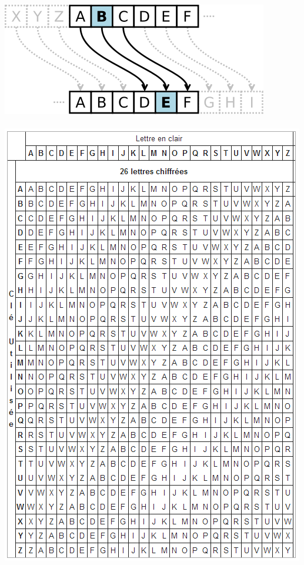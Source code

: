 \documentclass[a4paper,12pt,abstracton,titlepage]{scrartcl}
\begin{document}
  \begin{minipage}[t]{0.4\linewidth}
    \raggedleft
    \strut\vspace*{-\baselineskip}\newline\includegraphics[width=0.9\linewidth]{./Pictures/chiffreCesar.png}
    \label{cesar}
    \paragraph{}
    \strut\vspace*{-\baselineskip}\newline\includegraphics[width=0.9\linewidth]{./Pictures/tableauVigenere.png}
    \label{tabVig}
  \end{minipage}
\end{document}
